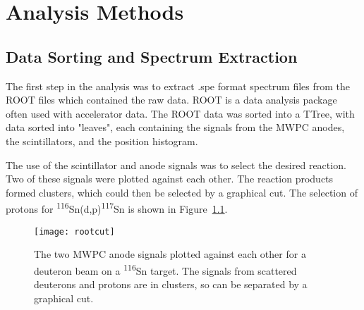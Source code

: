 



\chapter{Analysis Methods} %

\label{Chapter5} %





\section{Data Sorting and Spectrum Extraction}

The first step in the analysis was to extract .spe format spectrum files from the ROOT\cite{root} files which contained the raw data. ROOT is a data analysis package often used with accelerator data. The ROOT data was sorted into a TTree, with data sorted into "leaves", each containing the signals from the MWPC anodes, the scintillators, and the position histogram.

The use of the  scintillator and anode signals was to select the desired reaction. Two of these signals were plotted against each other. The reaction products formed clusters, which could then be selected by a graphical cut. The selection of protons for \textsuperscript{116}Sn(d,p)\textsuperscript{117}Sn is shown in Figure~\ref{rootCut}.

\begin{figure}[h]	
\hspace*{-0.5cm}
\begin{center}	
	\texttt{[image: rootcut]}
\end{center}
			\caption[Using ROOT cuts for reaction selection]{The two MWPC anode signals plotted against each other for a deuteron beam on a \textsuperscript{116}Sn target. The signals from scattered deuterons and protons are in clusters, so can be separated by a graphical cut. }
		\label{rootCut}
\end{figure}
\FloatBarrier


